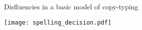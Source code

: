 \begin{frame}{Disfluencies in a basic model of copy-typing}	
	\begin{center}
		\texttt{[image: spelling\_decision.pdf]}
	\end{center}
\end{frame}
